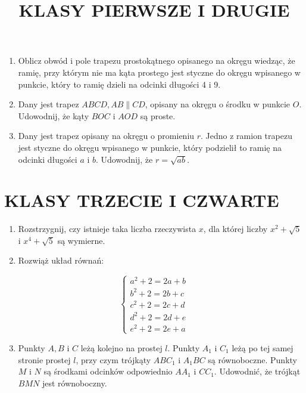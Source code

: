 \documentclass[10pt]{article}
\title{KLASY PIERWSZE I DRUGIE }
\author{}
\date{}
\begin{document}
\maketitle
\begin{enumerate}
  \item Oblicz obwód i pole trapezu prostokątnego opisanego na okręgu wiedząc, że ramię, przy którym nie ma kąta prostego jest styczne do okręgu wpisanego w punkcie, który to ramię dzieli na odcinki długości 4 i 9.
  \item Dany jest trapez \(A B C D, A B \| C D\), opisany na okręgu o środku w punkcie \(O\). Udowodnij, że kąty \(B O C\) i \(A O D\) są proste.
  \item Dany jest trapez opisany na okręgu o promieniu \(r\). Jedno z ramion trapezu jest styczne do okręgu wpisanego w punkcie, który podzielił to ramię na odcinki długości \(a\) i \(b\). Udowodnij, że \(r=\sqrt{a b}\).
\end{enumerate}

\section*{KLASY TRZECIE I CZWARTE}
\begin{enumerate}
  \item Rozstrzygnij, czy istnieje taka liczba rzeczywista \(x\), dla której liczby \(x^{2}+\sqrt{5}\) i \(x^{4}+\sqrt{5}\) są wymierne.
  \item Rozwiąż układ równań:
\end{enumerate}

\[
\left\{\begin{array}{l}
a^{2}+2=2 a+b \\
b^{2}+2=2 b+c \\
c^{2}+2=2 c+d \\
d^{2}+2=2 d+e \\
e^{2}+2=2 e+a
\end{array}\right.
\]

\begin{enumerate}
  \setcounter{enumi}{2}
  \item Punkty \(A, B\) i \(C\) leżą kolejno na prostej \(l\). Punkty \(A_{1}\) i \(C_{1}\) leżą po tej samej stronie prostej \(l\), przy czym trójkąty \(A B C_{1}\) i \(A_{1} B C\) są równoboczne. Punkty \(M\) i \(N\) są środkami odcinków odpowiednio \(A A_{1}\) i \(C C_{1}\). Udowodnić, że trójkąt \(B M N\) jest równoboczny.
\end{enumerate}
\end{document}
